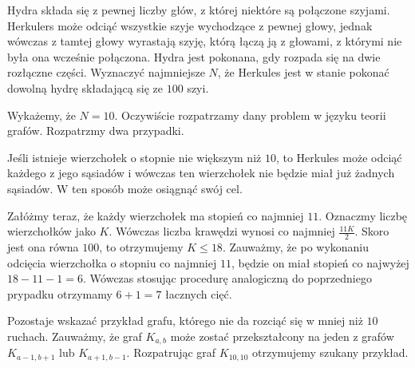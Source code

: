 \vspace{5px}

\begin{problem}{6}
	Hydra składa się z pewnej liczby głów, z której niektóre są połączone szyjami. Herkulers może odciąć wszystkie szyje wychodzące z pewnej głowy, jednak wówczas z tamtej głowy wyrastają szyję, którą łączą ją z głowami, z którymi nie była ona wcześnie połączona. Hydra jest pokonana, gdy rozpada się na dwie rozłączne części. Wyznaczyć najmniejsze $N$, że Herkules jest w stanie pokonać dowolną hydrę składającą się ze $100$ szyi.
\end{problem}

\noindent
Wykażemy, że $N = 10$. Oczywiście rozpatrzamy dany problem w języku teorii grafów. Rozpatrzmy dwa przypadki.

Jeśli istnieje wierzchołek o stopnie nie większym niż $10$, to Herkules może odciąć każdego z jego sąsiadów i wówczas ten wierzchołek nie będzie miał już żadnych sąsiadów. W ten sposób może osiągnąć swój cel.

Załóżmy teraz, że każdy wierzchołek ma stopień co najmniej $11$. Oznaczmy liczbę wierzchołków jako $K$. Wówczas liczba krawędzi wynosi co najmniej $\frac{11K}{2}$. Skoro jest ona równa $100$, to otrzymujemy $K \leqslant 18$. Zauważmy, że po wykonaniu odcięcia wierzchołka o stopniu co najmniej $11$, będzie on miał stopień co najwyżej $18 - 11 - 1 = 6$. Wówczas stosując procedurę analogiczną do poprzedniego prypadku otrzymamy $6 + 1 = 7$ łacznych cięć.


Pozostaje wskazać przykład grafu, którego nie da rozciąć się w mniej niż $10$ ruchach. Zauważmy, że graf $K_{a,b}$ może zostać przekształcony na jeden z grafów $K_{a - 1,b + 1}$ lub $K_{a + 1,b - 1}$. Rozpatrując graf $K_{10,10}$ otrzymujemy szukany przykład.
